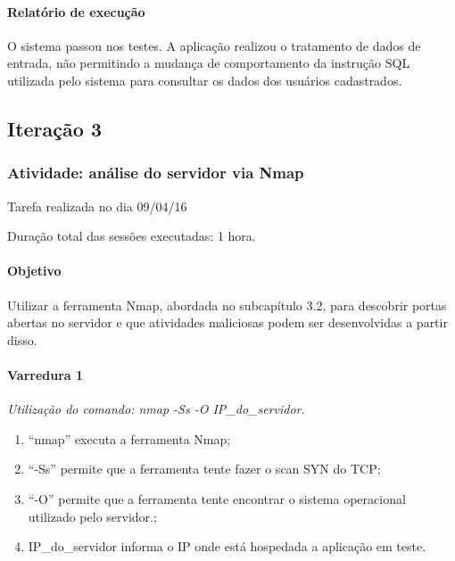 \documentclass[
    12pt,               %
    openright,          %
    oneside,            %
    a4paper,            %
    section=TITLE,     %
    english,            %
    french,             %
    spanish,            %
    brazil              %
    ]{abntex2}
\begin{document}
\paragraph*{Relatório de execução}

O sistema passou nos testes. A aplicação realizou o tratamento de dados de entrada, não permitindo a mudança de comportamento da instrução SQL utilizada pelo sistema para consultar os dados dos usuários cadastrados.





\subsection{Iteração 3}


\subsubsection*{Atividade: análise do servidor via Nmap}

Tarefa realizada no dia 09/04/16


Duração total das sessões executadas: 1 hora.



\paragraph*{Objetivo}

Utilizar a ferramenta Nmap, abordada no subcapítulo 3.2, para descobrir portas abertas no servidor e que atividades maliciosas podem ser desenvolvidas a partir disso.



\paragraph*{Varredura 1}

\emph{Utilização do comando: nmap -Ss -O IP\_do\_servidor.}



\begin{enumerate}[start=1]
	
\item \textquotedblleft{}nmap\textquotedblright{} executa a ferramenta Nmap;
	
\item \textquotedblleft{}-Ss\textquotedblright{} permite que a ferramenta tente fazer o scan SYN do TCP;
	
\item \textquotedblleft{}-O\textquotedblright{} permite que a ferramenta tente encontrar o sistema operacional utilizado pelo servidor.;
	
\item IP\_do\_servidor informa o IP onde está hospedada a aplicação em teste.

\end{enumerate}
\end{document}
